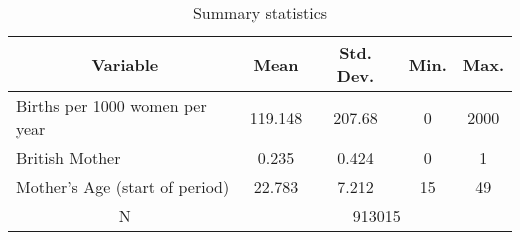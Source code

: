 
\begin{table}[htbp]\centering \caption{Summary statistics \label{sumstat}}
\begin{tabular}{l c c c c }\hline\hline
\multicolumn{1}{c}{\textbf{Variable}} & \textbf{Mean}
 & \textbf{Std. Dev.}& \textbf{Min.} &  \textbf{Max.} \\ \hline
Births per 1000 women per year & 119.148 & 207.68 & 0 & 2000 \\
British Mother & 0.235 & 0.424 & 0 & 1 \\
Mother's Age (start of period) & 22.783 & 7.212 & 15 & 49 \\
\multicolumn{1}{c}{N} & \multicolumn{4}{c}{913015}\\ \hline\end{tabular}
\end{table}

